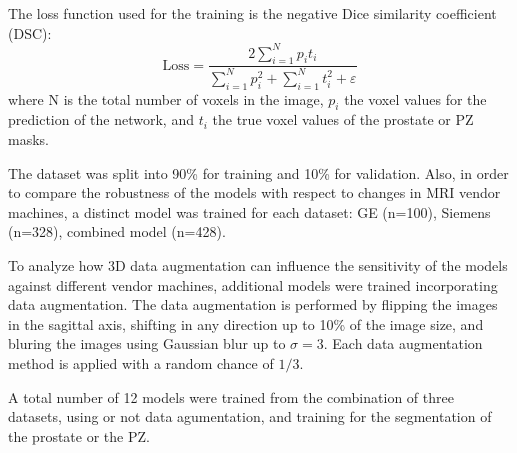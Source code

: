 The loss function used for the training is the negative Dice similarity coefficient (DSC):
\begin{equation}
\text{Loss} = \frac{2 \sum_{i=1}^{N}p_it_i}{\sum_{i=1}^{N}p_i^2 + \sum_{i=1}^{N}t_i^2 + \varepsilon} 
\label{eq:dsc}
\end{equation}
where N is the total number of voxels in the image, $p_i$ the voxel values for the 
prediction of the network, and $t_i$ the true voxel values of the prostate or PZ masks.

The dataset was split into 90\% for training and 10\% for
validation. Also, in order to compare the robustness of the models with respect to changes
in MRI vendor machines,  a distinct model was trained for each dataset: GE (n=100), 
Siemens (n=328), combined model (n=428). 

To analyze how 3D data augmentation can influence the sensitivity of the models
against different vendor machines, additional models were trained 
incorporating data augmentation. The data augmentation is performed by flipping the
images in the sagittal axis,  shifting in any direction up to 10\% of the image size, and
bluring the images using Gaussian blur up to $\sigma = 3$. Each data augmentation
method is applied with a random chance of $1/3$.

A total number of 12 models were trained from the combination of 
three datasets, using or not data agumentation, and training for the segmentation 
of the prostate or the PZ. 
